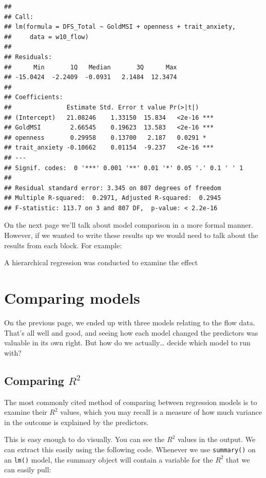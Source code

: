 \documentclass[
]{book}
\begin{document}
\begin{verbatim}
## 
## Call:
## lm(formula = DFS_Total ~ GoldMSI + openness + trait_anxiety, 
##     data = w10_flow)
## 
## Residuals:
##      Min       1Q   Median       3Q      Max 
## -15.0424  -2.2409  -0.0931   2.1484  12.3474 
## 
## Coefficients:
##               Estimate Std. Error t value Pr(>|t|)    
## (Intercept)   21.08246    1.33150  15.834   <2e-16 ***
## GoldMSI        2.66545    0.19623  13.583   <2e-16 ***
## openness       0.29958    0.13700   2.187   0.0291 *  
## trait_anxiety -0.10662    0.01154  -9.237   <2e-16 ***
## ---
## Signif. codes:  0 '***' 0.001 '**' 0.01 '*' 0.05 '.' 0.1 ' ' 1
## 
## Residual standard error: 3.345 on 807 degrees of freedom
## Multiple R-squared:  0.2971, Adjusted R-squared:  0.2945 
## F-statistic: 113.7 on 3 and 807 DF,  p-value: < 2.2e-16
\end{verbatim}

On the next page we'll talk about model comparison in a more formal manner. However, if we wanted to write these results up we would need to talk about the results from each block. For example:

A hierarchical regression was conducted to examine the effect

\section{Comparing models}\label{comparing-models}

On the previous page, we ended up with three models relating to the flow data. That's all well and good, and seeing how each model changed the predictors was valuable in its own right. But how do we actually\ldots{} decide which model to run with?

\subsection{\texorpdfstring{Comparing \(R^2\)}{Comparing R\^{}2}}\label{comparing-r2}

The most commonly cited method of comparing between regression models is to examine their \(R^2\) values, which you may recall is a measure of how much variance in the outcome is explained by the predictors.

This is easy enough to do visually. You can see the \(R^2\) values in the output. We can extract this easily using the following code. Whenever we use \texttt{summary()} on an \texttt{lm()} model, the summary object will contain a variable for the \(R^2\) that we can easily pull:
\end{document}
